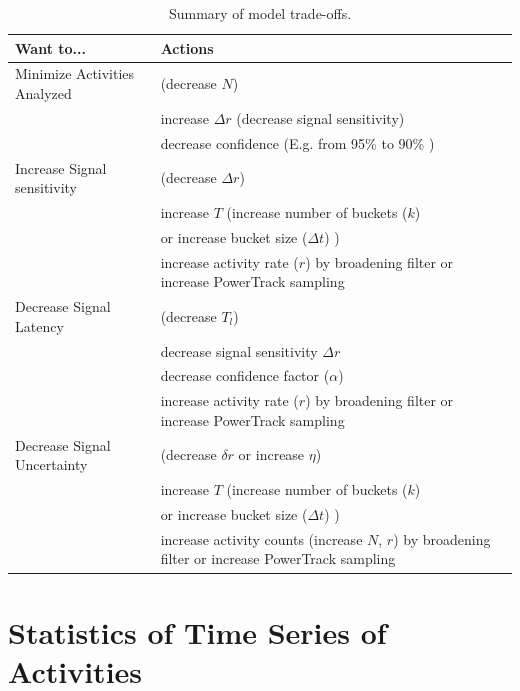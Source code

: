 \documentclass{article}
\begin{document}
\begin{table}
\caption{Summary of model trade-offs.}
\label{tab:tradeoff}
    \begin{tabular}{l| m{7cm}}
     \hline
Want to...  & Actions \\
\hline
Minimize Activities Analyzed   & (decrease $N$)  \\
                                  & increase $\Delta r$ (decrease signal sensitivity)  \\
                                  & decrease confidence (E.g. from 95\% to 90\% )  \\
\hline	
Increase Signal sensitivity   & (decrease $\Delta r$)  \\
                                  & increase $T$ (increase number of buckets ($k$)  \\
                                  & or increase bucket size ($\Delta t$) )  \\
                                  & increase activity rate ($r$) by broadening filter or increase PowerTrack sampling \\
\hline
Decrease Signal Latency      & (decrease $T_l$)  \\
                                 & decrease signal sensitivity $\Delta r$  \\
                                 & decrease confidence factor ($\alpha$) \\
                                 & increase activity rate ($r$) by broadening filter or increase PowerTrack sampling \\
\hline
Decrease Signal Uncertainty & (decrease $\delta r$ or increase $\eta$) \\
                          	  & increase $T$ (increase number of buckets ($k$)  \\
                                 & or increase bucket size ($\Delta t$) )  \\
                                 & increase activity counts (increase $N$, $r$) by broadening filter or increase PowerTrack sampling \\
\hline
\end{tabular}

\end{table}

\section{Statistics of Time Series of Activities} %
\end{document}
